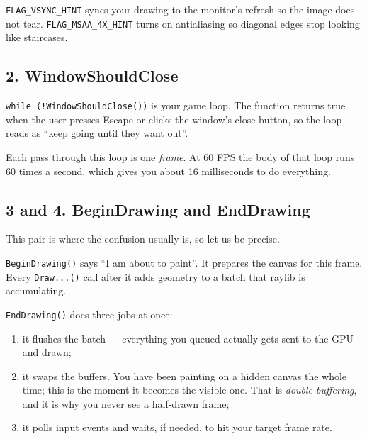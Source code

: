 \lstinline|FLAG_VSYNC_HINT| syncs your drawing to the monitor's refresh so the
image does not tear. \lstinline|FLAG_MSAA_4X_HINT| turns on antialiasing so
diagonal edges stop looking like staircases.

\subsection{2. WindowShouldClose}

\lstinline|while (!WindowShouldClose())| is your game loop. The function returns
true when the user presses Escape or clicks the window's close button, so the
loop reads as ``keep going until they want out''.

Each pass through this loop is one \emph{frame}. At 60 FPS the body of that loop
runs 60 times a second, which gives you about 16 milliseconds to do everything.

\subsection{3 and 4. BeginDrawing and EndDrawing}

This pair is where the confusion usually is, so let us be precise.

\lstinline|BeginDrawing()| says ``I am about to paint''. It prepares the canvas
for this frame. Every \lstinline|Draw...()| call after it adds geometry to a
batch that raylib is accumulating.

\lstinline|EndDrawing()| does three jobs at once:

\begin{enumerate}[leftmargin=*,itemsep=2pt]
  \item it flushes the batch --- everything you queued actually gets sent to the
        GPU and drawn;
  \item it swaps the buffers. You have been painting on a hidden canvas the whole
        time; this is the moment it becomes the visible one. That is
        \emph{double buffering}, and it is why you never see a half-drawn frame;
  \item it polls input events and waits, if needed, to hit your target frame rate.
\end{enumerate}


